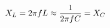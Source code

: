 \documentclass[preview]{standalone}
\begin{document}
\begin{align*}
\special{dvisvgm:raw <g id='unique000'>}X_L=2\pi fL\approx\frac{1}{2\pi fC}=X_C\special{dvisvgm:raw </g>}
\end{align*}
\end{document}
